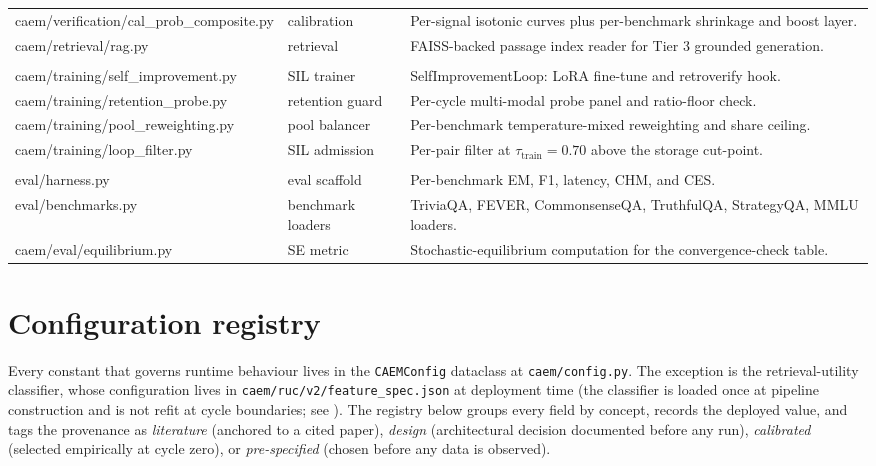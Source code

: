 {\begin{longtable}{@{}>{\ttfamily}p{5.8cm}p{2.2cm}p{6.6cm}@{}}
caem/verification/cal\_prob\_composite.py & calibration      & Per-signal isotonic curves plus per-benchmark shrinkage and boost layer. \\
caem/retrieval/rag.py                    & retrieval         & FAISS-backed passage index reader for Tier 3 grounded generation. \\
\midrule
\multicolumn{3}{@{}l}{\textnormal{\textit{Training}}} \\
caem/training/self\_improvement.py & SIL trainer     & SelfImprovementLoop: LoRA fine-tune and retroverify hook. \\
caem/training/retention\_probe.py  & retention guard & Per-cycle multi-modal probe panel and ratio-floor check. \\
caem/training/pool\_reweighting.py & pool balancer   & Per-benchmark temperature-mixed reweighting and share ceiling. \\
caem/training/loop\_filter.py      & SIL admission   & Per-pair filter at $\tau_{\text{train}} = 0.70$ above the storage cut-point. \\
\midrule
\multicolumn{3}{@{}l}{\textnormal{\textit{Evaluation}}} \\
eval/harness.py            & eval scaffold     & Per-benchmark EM, F1, latency, CHM, and CES. \\
eval/benchmarks.py         & benchmark loaders & TriviaQA, FEVER, CommonsenseQA, TruthfulQA, StrategyQA, MMLU loaders. \\
caem/eval/equilibrium.py   & SE metric         & Stochastic-equilibrium computation for the convergence-check table. \\
\end{longtable}
}

\section{Configuration registry}
\label{app:config-registry}

Every constant that governs runtime behaviour lives in the \verb|CAEMConfig| dataclass at \verb|caem/config.py|. The exception is the retrieval-utility classifier, whose configuration lives in \verb|caem/ruc/v2/feature_spec.json| at deployment time (the classifier is loaded once at pipeline construction and is not refit at cycle boundaries; see ). The registry below groups every field by concept, records the deployed value, and tags the provenance as \emph{literature} (anchored to a cited paper), \emph{design} (architectural decision documented before any run), \emph{calibrated} (selected empirically at cycle zero), or \emph{pre-specified} (chosen before any data is observed).

